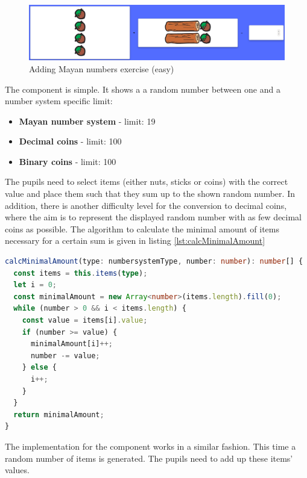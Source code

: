 \begin{figure} 
  \centering
  \includegraphics[width=1.0 \columnwidth]{figures/mayas_addition.png}
  \caption{Adding Mayan numbers exercise (easy)} 
  \label{fig:mayanAddition} 
\end{figure}

The  component is simple. It shows a a random number between one and a number system specific limit:

\begin{itemize}
  \item \textbf{Mayan number system} - limit: 19
  \item \textbf{Decimal coins} - limit: 100
  \item \textbf{Binary coins} - limit: 100
\end{itemize}

The pupils need to select items (either nuts, sticks or coins) with the correct value and place them such that they sum up to the shown random number.
In addition, there is another difficulty level for the conversion to decimal coins, where the aim is to represent the displayed random number with as few decimal coins as possible. The algorithm to calculate the minimal amount of items necessary for a certain sum is given in listing \ref{lst:calcMinimalAmount} 


\begin{lstlisting}[language=TypeScript,caption={Calculate minimal amount of items needed to reach a certain number},label={lst:calcMinimalAmount}]
calcMinimalAmount(type: numbersystemType, number: number): number[] {
  const items = this.items(type);
  let i = 0;
  const minimalAmount = new Array<number>(items.length).fill(0);
  while (number > 0 && i < items.length) {
    const value = items[i].value;
    if (number >= value) {
      minimalAmount[i]++;
      number -= value;
    } else {
      i++;
    }
  }
  return minimalAmount;
}
\end{lstlisting}

The implementation for the  component works in a similar fashion. This time a random number of items is generated. The pupils need to add up these items' values.

